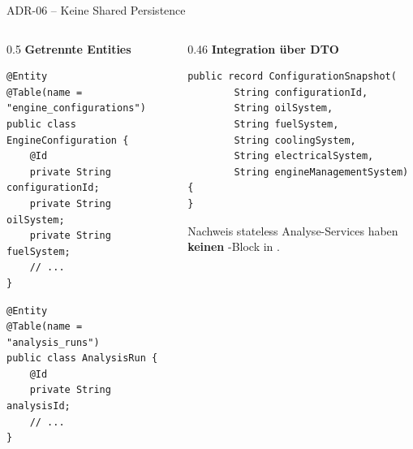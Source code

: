 \begin{frame}[fragile]{ADR-06 -- Keine Shared Persistence}
  \begin{columns}[T,onlytextwidth]
    \begin{column}{0.5\textwidth}
      \textbf{Getrennte Entities}
      \begin{lstlisting}[style=java]
@Entity
@Table(name = "engine_configurations")
public class EngineConfiguration {
    @Id
    private String configurationId;
    private String oilSystem;
    private String fuelSystem;
    // ...
}
      \end{lstlisting}

      \begin{lstlisting}[style=java]
@Entity
@Table(name = "analysis_runs")
public class AnalysisRun {
    @Id
    private String analysisId;
    // ...
}
      \end{lstlisting}
    \end{column}
    \begin{column}{0.46\textwidth}
      \textbf{Integration über DTO}
      \begin{lstlisting}[style=java]
public record ConfigurationSnapshot(
        String configurationId,
        String oilSystem,
        String fuelSystem,
        String coolingSystem,
        String electricalSystem,
        String engineManagementSystem) {
}
      \end{lstlisting}
      \begin{block}{Nachweis stateless}
        \small Analyse-Services haben \textbf{keinen} -Block in .
      \end{block}
    \end{column}
  \end{columns}
\end{frame}
